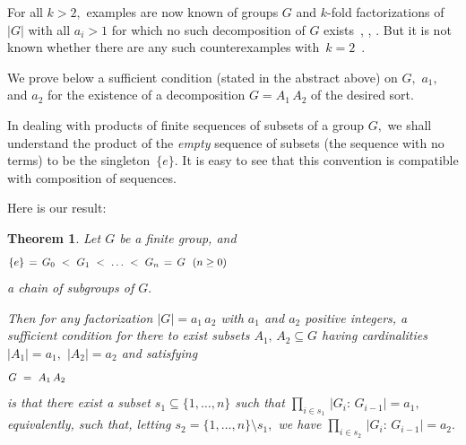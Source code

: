 \documentclass{amsart}
\newtheorem{theorem}{Theorem}
\numberwithin{equation}{section}
\numberwithin{theorem}{section}
\begin{document}
For all $k > 2,$ examples are now known
of groups $G$ and $\!k\!$-fold factorizations of $|G|$
with all $a_i>1$ for which no such
decomposition of $G$ exists~\cite{GMB}, \cite{MK}, \cite{McC}.
But it is not known whether there are any such counterexamples
with~$k=2$~\cite[Question~20.37]{Kourovka21}.

We prove below a sufficient condition
(stated in the abstract above) on $G,$ $a_1,$ and $a_2$
for the existence of a decomposition $G=A_1\,A_2$ of the desired sort.

In dealing with products of finite sequences of subsets of a
group $G,$ we shall understand the product of the {\em empty}
sequence of subsets
(the sequence with no terms) to be the singleton~$\{e\}.$
It is easy to see that this convention
is compatible with composition of sequences.

Here is our result:

\begin{theorem}\label{T.main}
Let $G$ be a finite group, and
%
\begin{equation}\begin{minipage}[c]{35pc}\label{d.G0Gn}
$\{e\}\,=\,G_0\ <\ G_1\ <\ \dots\ <\ G_n\,=\,G$ \ $(n\geq 0)$
\end{minipage}\end{equation}
%
a chain of subgroups of $G.$

Then for any factorization $|G| = a_1\,a_2$ with $a_1$ and $a_2$
positive integers, a {\em sufficient}
condition for there to exist subsets $A_1,\,A_2\subseteq G$
having cardinalities $|A_1|=a_1,$ $|A_2|=a_2$ and satisfying
%
\begin{equation}\begin{minipage}[c]{35pc}\label{d.A1A2}
$G\ =\ A_1\,A_2$
\end{minipage}\end{equation}
%
is that there exist a subset $s_1\subseteq\{1,\dots,n\}$
such that $\prod_{i\in s_1}\,|G_i:\,G_{i-1}| = a_1,$
equivalently, such that, letting $s_2=\{1,\dots,n\}\setminus s_1,$
we have $\prod_{i\in s_2}\,|G_i:\,G_{i-1}| = a_2.$
\end{theorem}
\end{document}
